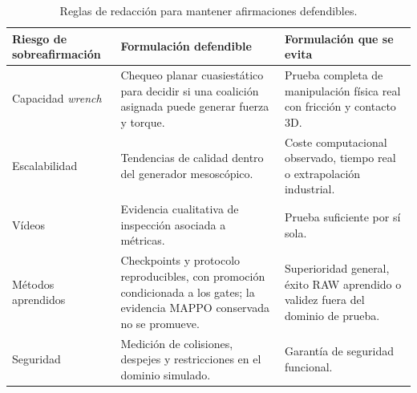 \begin{table}[H]
\centering
\scriptsize
\begin{tabularx}{\textwidth}{@{}p{}X X@{}}
\toprule
Riesgo de sobreafirmación & Formulación defendible & Formulación que se evita \\
\midrule
Capacidad \emph{wrench} & Chequeo planar cuasiestático para decidir si una coalición asignada puede generar fuerza y torque. & Prueba completa de manipulación física real con fricción y contacto 3D. \\
Escalabilidad & Tendencias de calidad dentro del generador mesoscópico. & Coste computacional observado, tiempo real o extrapolación industrial. \\
Vídeos & Evidencia cualitativa de inspección asociada a métricas. & Prueba suficiente por sí sola. \\
Métodos aprendidos & Checkpoints y protocolo reproducibles, con promoción condicionada a los gates; la evidencia MAPPO conservada no se promueve. & Superioridad general, éxito RAW aprendido o validez fuera del dominio de prueba. \\
Seguridad & Medición de colisiones, despejes y restricciones en el dominio simulado. & Garantía de seguridad funcional. \\
\bottomrule
\end{tabularx}
\caption{Reglas de redacción para mantener afirmaciones defendibles.}
\label{tab:riesgos-sobreafirmacion}
\end{table}
